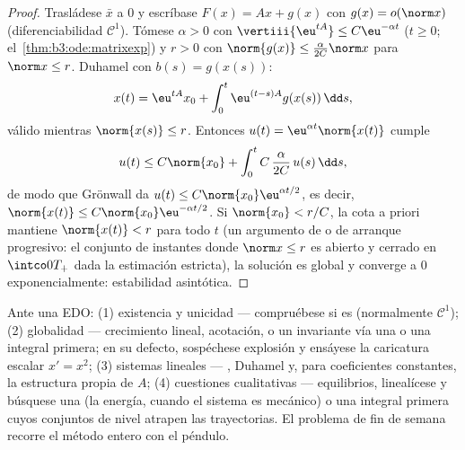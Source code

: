 \begin{proof}
Trasládese $\bar x$ a $0$ y escríbase $F(x) = Ax + g(x)$ con
$g(x) = o(\norm x)$ (diferenciabilidad $\mathcal C^1$). Tómese
$\alpha > 0$ con $\vertiii{\eu^{tA}} \leq C\eu^{-\alpha t}$ ($t \geq 0$;
el~\cref{thm:b3:ode:matrixexp}) y $r > 0$ con
$\norm{g(x)} \leq \frac{\alpha}{2C}\norm x$ para $\norm x \leq
r$. Duhamel con $b(s) = g(x(s))$:
\[
x(t) = \eu^{tA}x_0 + \int_0^t\eu^{(t-s)A}g(x(s))\,\dd s,
\]
válido mientras $\norm{x(s)} \leq r$. Entonces $u(t) =
\eu^{\alpha t}\norm{x(t)}$ cumple
\[
u(t) \leq C\norm{x_0} +
\int_0^{t}C\,\frac{\alpha}{2C}\,u(s)\,\dd s ,
\]
de modo que Grönwall da $u(t) \leq C\norm{x_0}\eu^{\alpha t/2}$, es
decir, $\norm{x(t)} \leq C\norm{x_0}\eu^{-\alpha t/2}$. Si
$\norm{x_0} < r/C$, la cota a priori mantiene $\norm{x(t)} <
r$ para todo $t$ (un argumento de
 o de arranque
progresivo: el conjunto de instantes donde $\norm x \leq r$ es abierto y
cerrado en $\intco0{T_+}$ dada la estimación estricta), la solución es
global y converge a $0$ exponencialmente: estabilidad asintótica.
\end{proof}

\begin{method}\label{met:b3:ode:strategy}
Ante una EDO: (1) existencia y unicidad --- compruébese si es  (normalmente $\mathcal C^1$); (2) globalidad ---
crecimiento lineal, acotación, o un
 invariante vía una
 o una integral
primera; en su defecto, sospéchese explosión y ensáyese la caricatura
escalar $x' = x^2$; (3) sistemas lineales ---
, Duhamel y, para
coeficientes constantes, la estructura propia de $A$; (4) cuestiones
cualitativas --- equilibrios, linealícese y búsquese una
 (la energía, cuando el
sistema es mecánico) o una integral primera cuyos conjuntos de nivel
atrapen las trayectorias. El problema de fin de semana recorre el método
entero con el péndulo.
\end{method}

